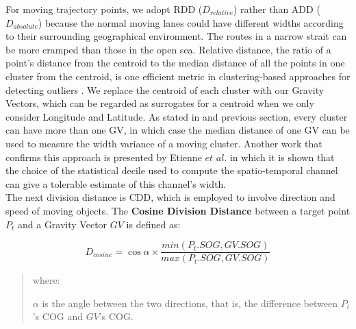 \documentclass[12pt,glossary]{dalcsthesis}
\begin{document}
For moving trajectory points, we adopt RDD ($D_{relative}$) rather than ADD ($D_{absolute}$) because the normal moving lanes could have different widths according to their surrounding geographical environment. The routes in a narrow strait can be more cramped than those in the open sea. Relative distance, the ratio of a point's distance from the centroid to the median distance of all the points in one cluster from the centroid, is one efficient metric in clustering-based approaches for detecting outliers \cite{PangNing05}. We replace the centroid of each cluster with our Gravity Vectors, which can be regarded as surrogates for a centroid when we only consider Longitude and Latitude.
As stated in \cite{bigdata2014} and previous section, every cluster can have more than one GV, in which case the median distance %
of one GV
can be used to measure the width variance of a moving cluster. Another work that confirms this approach is presented by Etienne $et$ $al.$ \cite{Etienne12} in which it is shown that
the choice of the statistical decile used to compute the spatio-temporal channel can give a tolerable estimate of this channel's width.\\

The next division distance is CDD, which is employed to involve direction and speed of moving objects. The \textbf{Cosine Division Distance} between a target point $P_t$ and a Gravity Vector $GV$ is defined as:

\begin{equation}
\label{eq:cdd}
D_{cosine} = \cos\alpha\times\frac{min(P_t.SOG,GV.SOG)}{max(P_t.SOG,GV.SOG)}
\end{equation}
\begin{quote}
where:

 $\alpha$ is the angle between the two directions, that is, the difference between $P_t$'s COG and $GV$'s COG. \\
\end{quote}

\end{document}
